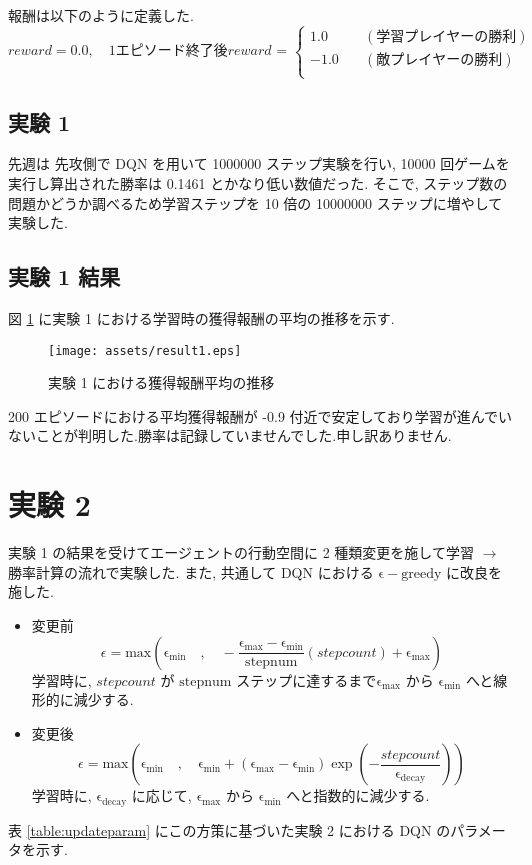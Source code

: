 \documentclass{jarticle}     %
\begin{document}
  報酬は以下のように定義した.
  \begin{equation*}
    \label{reward}
    reward = 0.0,
    \quad 
    \mathrm{1 エピソード終了後}
    reward \text{ = }
    \left\{
      \begin{aligned}
          1.0 \quad & (学習プレイヤーの勝利) \\
          -1.0 \quad & (敵プレイヤーの勝利) \\
      \end{aligned}
      \right.
  \end{equation*}

  \subsection{実験 1}
  先週は 先攻側で DQN を用いて 1000000 ステップ実験を行い, 10000 回ゲームを実行し算出された勝率は 0.1461 とかなり低い数値だった. そこで, ステップ数の問題かどうか調べるため学習ステップを 10 倍の 10000000 ステップに増やして実験した.

  \subsection{実験 1 結果}
  図 \ref{fig:DQN} に実験 1 における学習時の獲得報酬の平均の推移を示す.
  \begin{figure}[h]
    \centering
    \texttt{[image: assets/result1.eps]}
    \caption{実験 1 における獲得報酬平均の推移}
    \label{fig:DQN}
  \end{figure}
  
  200 エピソードにおける平均獲得報酬が -0.9 付近で安定しており学習が進んでいないことが判明した.勝率は記録していませんでした.申し訳ありません.
  
\section{実験 2}
実験 1 の結果を受けてエージェントの行動空間に 2 種類変更を施して学習 $\rightarrow$ 勝率計算の流れで実験した.
また, 共通して DQN における $\mathrm{\epsilon-greedy}$ に改良を施した.
\begin{itemize}
  \item 変更前
  \begin{equation*}
    \epsilon = \mathrm{max}(\mathrm{\epsilon_{min}} \quad , \quad -\frac{\mathrm{\epsilon_{max}} - \mathrm{\epsilon_{min}}}{\mathrm{stepnum}} (stepcount) + \mathrm{\epsilon_{max}})
  \end{equation*}
  学習時に, $stepcount$ が $\mathrm{stepnum}$ ステップに達するまで$\mathrm{\epsilon_{max}}$ から $\mathrm{\epsilon_{min}}$ へと線形的に減少する.
  \item 変更後
  \begin{equation*}
    \epsilon = \mathrm{max}(\mathrm{\epsilon_{min}} \quad , \quad \mathrm{\epsilon_{min}} + (\mathrm{\epsilon_{max} - \epsilon_{min}}) \exp(- \frac{stepcount}{\mathrm{\epsilon_{decay}}}))
  \end{equation*}
  学習時に, $\mathrm{\epsilon_{decay}}$ に応じて, $\mathrm{\epsilon_{max}}$ から $\mathrm{\epsilon_{min}}$ へと指数的に減少する.
\end{itemize}
表 \ref{table:updateparam} にこの方策に基づいた実験 2 における DQN のパラメータを示す.
\end{document}
